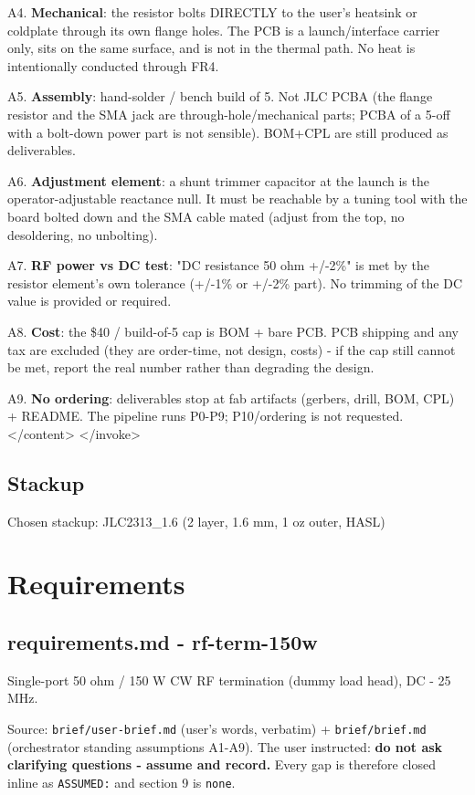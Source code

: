 \documentclass[11pt,a4paper]{article}
\begin{document}
A4. \textbf{Mechanical}: the resistor bolts DIRECTLY to the user's heatsink or coldplate through its own flange holes. The PCB is a launch/interface carrier only, sits on the same surface, and is not in the thermal path. No heat is intentionally conducted through FR4.

A5. \textbf{Assembly}: hand-solder / bench build of 5. Not JLC PCBA (the flange resistor and the SMA jack are through-hole/mechanical parts; PCBA of a 5-off with a bolt-down power part is not sensible). BOM+CPL are still produced as deliverables.

A6. \textbf{Adjustment element}: a shunt trimmer capacitor at the launch is the operator-adjustable reactance null. It must be reachable by a tuning tool with the board bolted down and the SMA cable mated (adjust from the top, no desoldering, no unbolting).

A7. \textbf{RF power vs DC test}: "DC resistance 50 ohm +/-2\%" is met by the resistor element's own tolerance (+/-1\% or +/-2\% part). No trimming of the DC value is provided or required.

A8. \textbf{Cost}: the \$40 / build-of-5 cap is BOM + bare PCB. PCB shipping and any tax are excluded (they are order-time, not design, costs) - if the cap still cannot be met, report the real number rather than degrading the design.

A9. \textbf{No ordering}: deliverables stop at fab artifacts (gerbers, drill, BOM, CPL) + README. The pipeline runs P0-P9; P10/ordering is not requested. \textless{}/content\textgreater{} \textless{}/invoke\textgreater{}

\subsection*{Stackup}
Chosen stackup: JLC2313\_1.6 (2 layer, 1.6 mm, 1 oz outer, HASL)
\section{Requirements}
\subsection*{requirements.md - rf-term-150w}
Single-port 50 ohm / 150 W CW RF termination (dummy load head), DC - 25 MHz.

Source: \texttt{brief/user-brief.md} (user's words, verbatim) + \texttt{brief/brief.md} (orchestrator standing assumptions A1-A9). The user instructed: \textbf{do not ask clarifying questions - assume and record.} Every gap is therefore closed inline as \texttt{ASSUMED:} and section 9 is \texttt{none}.
\end{document}
